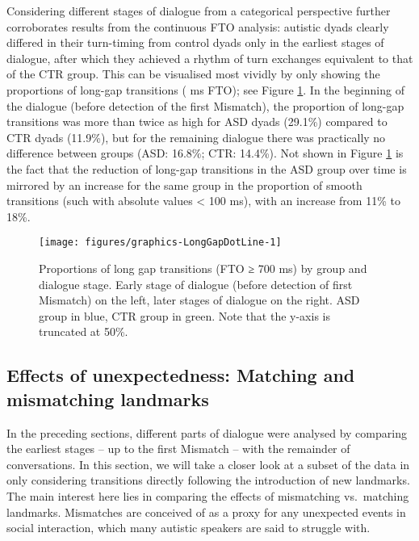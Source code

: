 Considering different stages of dialogue from a categorical perspective further corroborates results from the continuous FTO analysis: autistic dyads clearly differed in their turn-timing from control dyads only in the earliest stages of dialogue, after which they achieved a rhythm of turn exchanges equivalent to that of the CTR group. This can be visualised most vividly by only showing the proportions of long-gap transitions ( ms FTO); see Figure \ref{fig:LongGapDotLine}. In the beginning of the dialogue (before detection of the first Mismatch), the proportion of long-gap transitions was more than twice as high for ASD dyads (29.1\%) compared to CTR dyads (11.9\%), but for the remaining dialogue there was practically no difference between groups (ASD: 16.8\%; CTR: 14.4\%). Not shown in Figure \ref{fig:LongGapDotLine} is the fact that the reduction of long-gap transitions in the ASD group over time is mirrored by an increase for the same group in the proportion of smooth transitions (such with absolute values \textless{} 100 ms), with an increase from 11\% to 18\%.

\begin{figure}

{\centering \texttt{[image: figures/graphics-LongGapDotLine-1]} 
	
}

\caption{Proportions of long gap transitions (FTO ≥ 700 ms) by group and dialogue stage. Early stage of dialogue (before detection of first Mismatch) on the left, later stages of dialogue on the right. ASD group in blue, CTR group in green. Note that the y-axis is truncated at 50\%.}\label{fig:LongGapDotLine}
\end{figure}

\subsection{Effects of unexpectedness: Matching and mismatching landmarks}\label{sec:turntaking_results_mismatches}

In the preceding sections, different parts of dialogue were analysed by comparing the earliest stages -- up to the first Mismatch -- with the remainder of conversations. In this section, we will take a closer look at a subset of the data in only considering transitions directly following the introduction of new landmarks. The main interest here lies in comparing the effects of mismatching vs.~matching landmarks. Mismatches are conceived of as a proxy for any unexpected events in social interaction, which many autistic speakers are said to struggle with.

